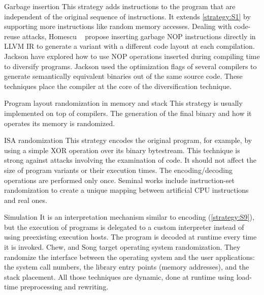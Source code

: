 \begin{strategy}{Garbage insertion}
    \label{strategy:S6}
    \normalfont
    This strategy adds instructions to the program that are independent of the original sequence of instructions. It extends \autoref{strategy:S1} by supporting more instructions like random memory accesses.
    Dealing with code-reuse attacks, Homescu \etal~\cite{homescu2013profile} propose inserting garbage NOP instructions directly in LLVM IR to generate a variant with a different code layout at each compilation. 
    Jackson \etal \cite{jackson} have explored how to use NOP operations inserted during compiling time to diversify programs. Jackson \etal \cite{jackson}  used the optimization flags of several compilers to generate semantically equivalent binaries out of the same source code. These techniques place the compiler at the core of the diversification technique. %
\end{strategy}

\begin{strategy}{Program layout randomization in memory and stack}
    \label{strategy:S7}
    \normalfont
    This strategy is usually implemented on top of compilers. The generation of the final binary and how it operates its memory is randomized.  %
\end{strategy}


\begin{strategy}{ISA randomization}
    \label{strategy:S8}
    \normalfont
    This strategy encodes the original program, for example, by using a simple XOR operation over its binary bytestream. This technique is strong against attacks involving the examination of code. It should not affect the size of program variants or their execution times. The encoding/decoding operations are performed only once. 
    Seminal works include instruction-set randomization \cite{Kc03,barrantes2003randomized}
    to create a unique mapping between artificial CPU instructions and real ones.
\end{strategy}


\begin{strategy}{Simulation}
    \label{strategy:S9}
    \normalfont
    It is an interpretation mechanism similar to encoding (\autoref{strategy:S9}), but the execution of programs is delegated to a custom interpreter instead of using preexisting execution hosts. The program is decoded at runtime every time it is invoked. 
    Chew, and Song \cite{Chew02mitigatingbuffer} target operating system randomization. They randomize the interface between the operating system and the user applications:
    the system call numbers, the library entry points (memory addresses), and the stack placement. All those techniques are dynamic, done at runtime using load-time preprocessing and rewriting. 
\end{strategy}


